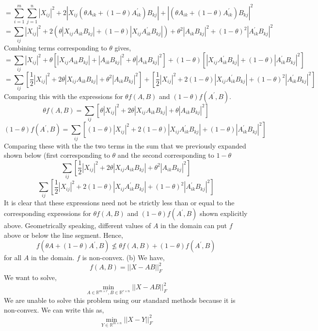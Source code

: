 \documentclass[12pt]{article}
\begin{document}
$$ =  \sum_{i=1}^{m}   \sum_{j=1}^{n}  |X_{ij} |^{2}  +  2|X_{ij}  ( \theta A_{ik}  + (1-\theta) A^{\prime}_{ik} ) B_{kj}|  + | ( \theta A_{ik}  + (1-\theta) A^{\prime}_{ik} ) B_{kj} |^{2}    $$
$$ =\sum_{ij}  |X_{ij} |^{2}  +  2( \theta |X_{ij} A_{ik} B_{kj}|  +   (1-\theta) |X_{ij} A_{ik}^{\prime} B_{kj}| )  +  \theta^{2}|A_{ik} B_{kj}  |^{2} +  (1-\theta)^{2}|A_{ik}^{\prime} B_{kj} |^{2}    $$
Combining terms corresponding to $\theta$ gives,  
$$ = \sum_{ij} |X_{ij} |^{2}  + \theta[|X_{ij} A_{ik} B_{kj}|  +  |A_{ik} B_{kj}|^{2}  +\theta |A_{ik} B_{kj}|^{2}]  + (1-\theta)[|X_{ij} A_{ik}^{\prime} B_{kj}|  + (1-\theta) |A_{ik}^{\prime} B_{kj}|^{2}]  $$
$$ =  \sum_{ij} [\frac{1}{2}  |X_{ij} |^{2}   + 2 \theta |X_{ij}A_{ik} B_{kj}| + \theta^{2}  |A_{ik} B_{kj}|^{2} ]  +    [\frac{1}{2}  |X_{ij} |^{2}   + 2(1-\theta)|X_{ij}A_{ik}^{\prime}  B_{kj}| + (1-\theta)^{2}  |A_{ik}^{\prime} B_{kj}|^{2}  ]      $$
Comparing this with the expressions for $\theta f(A,B)$ and  $(1-\theta)f(A^{\prime},B)$.  
$$ \theta f(A,B) =    \sum_{ij} [  \theta |X_{ij} |^{2}   + 2  \theta |X_{ij}A_{ik} B_{kj}| +  \theta |A_{ik} B_{kj}|^{2}] $$  
$$ (1-\theta) f(A^{\prime} ,B) =   \sum_{ij} [ (1-\theta)  |X_{ij} |^{2}   + 2 (1-\theta) |X_{ij}A_{ik}^{\prime} B_{kj}| +  (1-\theta)|A_{ik}^{\prime} B_{kj}|^{2}] $$  
 Comparing these with the the two terms in the sum that we previously expanded shown below (first corresponding to $\theta$ and the second corresponding to $1-\theta$
$$  \sum_{ij} [\frac{1}{2}  |X_{ij} |^{2}   + 2 \theta |X_{ij}A_{ik} B_{kj}| + \theta^{2}  |A_{ik} B_{kj}|^{2} ]  $$ 
$$   \sum_{ij} [\frac{1}{2}  |X_{ij} |^{2}   + 2(1-\theta)|X_{ij}A_{ik}^{\prime}  B_{kj}| + (1-\theta)^{2}  |A_{ik}^{\prime} B_{kj}|^{2}  ] $$
It is clear that these expressions need not be strictly less than or equal to the corresponding expressions for $ \theta f(A,B)$ and $ (1-\theta) f(A^{\prime} ,B)$ shown explicitly above. Geometrically speaking, different values of $A$  in the domain can put $f$ above or below the line segment. Hence, 
$$f(\theta A + (1-\theta) A^{\prime}, B)  \nleq   \theta f( A, B) +  (1-\theta ) f(A^{\prime} , B)     $$
for all $A$ in the domain. $f$ is non-convex. \newline  \newline 
(b) We have, 
$$ f(A,B) =  ||X - AB||_{F}^{2}  $$
We want to solve, 
$$\min_{A \in \mathbb{R}^{m\times r}, B  \in \mathbb{R}^{r\times n}} ||X - AB||_{F}^{2} $$
We are unable to solve this problem using our standard methods because it is non-convex. We can write this as,
$$ \min_{Y \in \mathbb{R}^{m\times n} } ||X -Y||_{F}^{2}  $$
\end{document}
